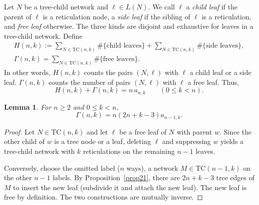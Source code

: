 \documentclass[11pt]{article}
\newtheorem{lemma}[theorem]{Lemma}
\theoremstyle{definition}
\theoremstyle{remark}
\newcommand{\TC}{\text{TC}}
\begin{document}
Let $N$ be a tree-child network and $\ell\in L(N)$. We call $\ell$  a \emph{child leaf} if the parent of $\ell$ is a reticulation node, a \emph{side leaf} if the sibling of $\ell$ is a reticulation, and \emph{free leaf} otherwise.
The three kinds are disjoint and exhaustive for leaves in a tree-child network. Define
\begin{eqnarray}
  H(n,k):=\sum_{N\in\TC(n,k)}\#\{\text{child leaves}\} +\sum_{N\in\TC(n,k)}\#\{\text{side leaves}\}, \\
  \Gamma(n, k)=\sum_{N\in\TC(n,k)}\#\{\text{free leaves}\}.
\end{eqnarray}
In other words,  $H(n,k)$ counts the pairs $(N,\ell)$ with $\ell$ a child leaf or a side leaf.  $\Gamma(n,k)$
counts the number of pairs $(N,\ell)$ with $\ell$ a free leaf. Thus, 
\begin{equation}\label{eqn44}
  H(n,k)+\Gamma(n,k)=n\,a_{n,k}\qquad (0\leq k < n).
\end{equation}


\begin{lemma}\label{lem12}
For $n\ge2$ and $0\le k<n$, 
\begin{equation}
\label{eqn55}
   \Gamma(n,k)=n(2n+k-3)a_{n-1,k}.
\end{equation}
\end{lemma}

\begin{proof}
%
 Let $N\in \TC(n,k)$ and let $\ell$ be a free leaf of $N$ with parent $w$. Since the other child of $w$ is a tree node or a leaf, deleting $\ell$ and suppressing $w$ yields a tree-child network with $k$ reticulations on the remaining $n-1$ leaves.

Conversely, choose the omitted label ($n$ ways), a
network $M\in \TC(n-1,k)$ on the other $n-1$ labels. By Proposition~\ref{prop21},  there are $2n+k-3$ tree edges of $M$ to insert the new leaf (subdivide it and attach the new leaf).
The new leaf is free by definition. The two constructions are mutually inverse.
\end{proof}

\end{document}
